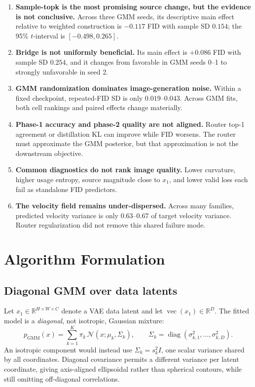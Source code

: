 \documentclass[11pt,a4paper]{article}
\begin{document}
\begin{enumerate}
  \item \textbf{Sample-topk is the most promising source change, but the
  evidence is not conclusive.} Across three GMM seeds, its descriptive main
  effect relative to weighted construction is \(-0.117\) FID with sample SD
  \(0.154\); the 95\% \(t\)-interval is \([-0.498,0.265]\).
  \item \textbf{Bridge is not uniformly beneficial.} Its main effect is
  \(+0.086\) FID with sample SD \(0.254\), and it changes from favorable in
  GMM seeds 0--1 to strongly unfavorable in seed 2.
  \item \textbf{GMM randomization dominates image-generation noise.}
  Within a fixed checkpoint, repeated-FID SD is only \(0.019\)--\(0.043\).
  Across GMM fits, both cell rankings and paired effects change materially.
  \item \textbf{Phase-1 accuracy and phase-2 quality are not aligned.}
  Router top-1 agreement or distillation KL can improve while FID worsens.
  The router must approximate the GMM posterior, but that approximation is not
  the downstream objective.
  \item \textbf{Common diagnostics do not rank image quality.} Lower
  curvature, higher usage entropy, source magnitude close to \(x_1\), and
  lower valid loss each fail as standalone FID predictors.
  \item \textbf{The velocity field remains under-dispersed.} Across many
  families, predicted velocity variance is only \(0.63\)--\(0.67\) of target
  velocity variance. Router regularization did not remove this shared failure
  mode.
\end{enumerate}

\section{Algorithm Formulation}

\subsection{Diagonal GMM over data latents}

Let \(x_1\in\mathbb{R}^{H\times W\times C}\) denote a VAE data latent and let
\(\operatorname{vec}(x_1)\in\mathbb{R}^{D}\). The fitted model is a
\emph{diagonal}, not isotropic, Gaussian mixture:
\[
 p_{\mathrm{GMM}}(x)
 =\sum_{k=1}^{K}\pi_k\,\mathcal N(x;\mu_k,\Sigma_k),
 \qquad
 \Sigma_k=\operatorname{diag}(\sigma_{k,1}^{2},\ldots,\sigma_{k,D}^{2}).
\]
An isotropic component would instead use
\(\Sigma_k=s_k^2 I\), one scalar variance shared by all coordinates. Diagonal
covariance permits a different variance per latent coordinate, giving
axis-aligned ellipsoidal rather than spherical contours, while still omitting
off-diagonal correlations.
\end{document}
